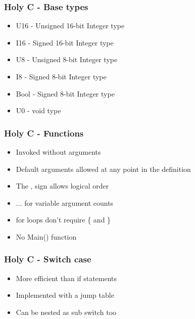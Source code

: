 \documentclass{beamer}
\begin{document}
	\begin{frame}
		\frametitle{Holy C - Base types}
		\begin{itemize}
			\item U16 - Unsigned 16-bit Integer type

			\item I16 - Signed 16-bit Integer type

			\item U8 - Unsigned 8-bit Integer type

			\item I8 - Signed 8-bit Integer type

			\item Bool - Signed 8-bit Integer type

			\item U0 - void type
		\end{itemize}
	\end{frame}

	\begin{frame}[fragile]
		\frametitle{Holy C - Functions}
		\begin{itemize}
			\item Invoked without arguments

			\item Default arguments allowed at any point in the definition

			\item The , sign allows logical order

			\item ... for variable argument counts

			\item for loops don't require \{ and \}

			\item No Main() function
		\end{itemize}
	\end{frame}

	\begin{frame}[fragile]
		\frametitle{Holy C - Switch case}
		\begin{itemize}
			\item More efficient than if statements

			\item Implemented with a jump table

			\item Can be nested as sub switch too
		\end{itemize}
	\end{frame}
\end{document}
